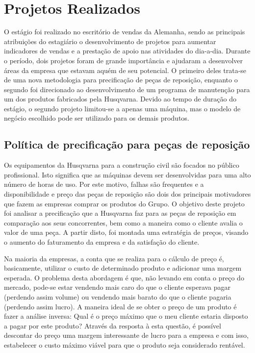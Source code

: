 \documentclass[12pt]{article}
\begin{document}
\section{Projetos Realizados}

	O estágio foi realizado no escritório de vendas da Alemanha, sendo as principais atribuições do estagiário o desenvolvimento de projetos para aumentar indicadores de vendas e a prestação de apoio nas atividades do dia-a-dia. Durante o período, dois projetos foram de grande importância e ajudaram a desenvolver áreas da empresa que estavam aquém de seu potencial. O primeiro deles trata-se de uma nova metodologia para precificação de peças de reposição, enquanto o segundo foi direcionado ao desenvolvimento de um programa de manutenção para um dos produtos fabricados pela Husqvarna. Devido ao tempo de duração do estágio, o segundo projeto limitou-se a apenas uma máquina, mas o modelo de negócio escolhido pode ser utilizado para os demais produtos.

\subsection{Política de precificação para peças de reposição}

	Os equipamentos da Husqvarna para a construção civil são focados no público profissional. Isto significa que as máquinas devem ser desenvolvidas para uma alto número de horas de uso. Por este motivo, falhas são frequentes e a disponibilidade e preço das peças de reposição são dois dos principais motivadores que fazem as empresas comprar os produtos do Grupo. O objetivo deste projeto foi analisar a precificação que a Husqvarna faz para as peças de reposição em comparação aos seus concorrentes, bem como a maneira como o cliente avalia o valor de uma peça. A partir disto, foi montada uma estratégia de preços, visando o aumento do faturamento da empresa e da satisfação do cliente.

	Na maioria da empresas, a conta que se realiza para o cálculo de preço é, basicamente, utilizar o custo de determinado produto e adicionar uma margem esperada. O problema desta abordagem é que, não levando em conta o preço do mercado, pode-se estar vendendo mais caro do que o cliente esperava pagar (perdendo assim volume) ou vendendo mais barato do que o cliente pagaria (perdendo assim lucro). A maneira ideal de se obter o preço de um produto é fazer a análise inversa: Qual é o preço máximo que o meu cliente estaria disposto a pagar por este produto? Através da resposta à esta questão, é possível descontar do preço uma margem interessante de lucro para a empresa e com isso, estabelecer o custo máximo viável para que o produto seja considerado rentável.
\end{document}
